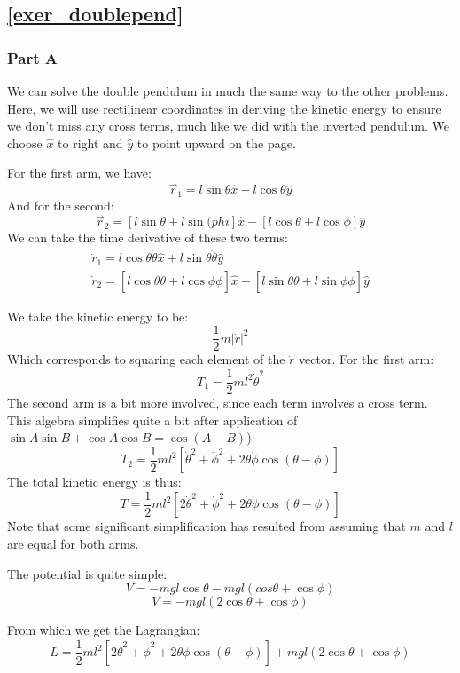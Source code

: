 \documentclass[10pt, openany, titlepage]{book}
\theoremstyle{definition}
\let\oldautoref\autoref
\renewcommand{\autoref}[1]{%
  \begingroup
  \hypersetup{linkcolor=black}%
  \oldautoref{#1}%
  \endgroup
}
\begin{document}
\subsection*{\texorpdfstring{\autoref{exer_doublepend}}{Double Pend Sol}}

\subsubsection{Part A}
We can solve the double pendulum in much the same way to the other problems. Here, we will use rectilinear coordinates in deriving the kinetic energy to ensure we don't miss any cross terms, much like we did with the inverted pendulum. We choose $\hat{x}$ to right and $\hat{y}$ to point upward on the page.

For the first arm, we have:
$$\vec{r}_1=l\sin\theta\hat{x}-l\cos\theta\hat{y}$$
And for the second:
$$\vec{r}_2=[l\sin\theta+l\sin(phi]\hat{x}-[l\cos\theta+l\cos\phi]\hat{y}$$
We can take the time derivative of these two terms:
\begin{gather}
\dot{r}_1=l\cos\theta\dot{\theta}\hat{x}+l\sin\theta\dot{\theta}\hat{y}\\
\dot{{r}}_2=[l\cos\theta\dot{\theta}+l\cos\phi\dot{\phi}]\hat{x}+[l\sin\theta\dot{\theta}+l\sin\phi\dot{\phi}]\hat{y}
\end{gather}

We take the kinetic energy to be:
$$\frac{1}{2}m|\dot{r}|^2$$
Which corresponds to squaring each element of the $\dot{r}$ vector. For the first arm:
$$T_1=\frac{1}{2}ml^2\dot{\theta}^2$$
The second arm is a bit more involved, since each term involves a cross term. This algebra simplifies quite a bit after application of  $\sin A\sin B+\cos A\cos B = \cos(A-B)$):
$$T_2=\frac{1}{2}ml^2\left[\dot{\theta}^2+\dot{\phi}^2+2\dot{\theta}\dot{\phi}\cos(\theta-\phi)\right]$$
The total kinetic energy is thus:
$$T=\frac{1}{2}ml^2\left[2\dot{\theta}^2+\dot{\phi}^2+2\dot{\theta}\dot{\phi}\cos(\theta-\phi)\right]$$
Note that some significant simplification has resulted from assuming that $m$ and $l$ are equal for both arms.

The potential is quite simple:
$$V=-mgl\cos\theta-mgl(cos\theta+\cos\phi)$$
$$V=-mgl(2\cos\theta+\cos\phi)$$

From which we get the Lagrangian:
$$L=\frac{1}{2}ml^2\left[2\dot{\theta}^2+\dot{\phi}^2+2\dot{\theta}\dot{\phi}\cos(\theta-\phi)\right]+mgl(2\cos\theta+\cos\phi)$$
\end{document}

